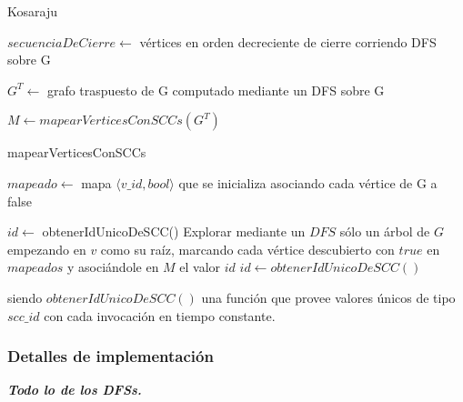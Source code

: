 \bigskip

\begin{algorithm}[H]
	\caption{Kosaraju}

    $\mathit{secuenciaDeCierre} \gets$ vértices en orden decreciente de cierre corriendo DFS sobre G \;

    $\mathit{G^T} \gets$ grafo traspuesto de G computado mediante un DFS sobre G \;

    $\mathit{M} \gets \mathit{mapearVerticesConSCCs(G^T)}$

\end{algorithm}

\bigskip

\begin{algorithm}[H]
    \caption{mapearVerticesConSCCs}

    $\mathit{mapeado} \gets$ mapa $\langle v\_id, bool \rangle$ que se inicializa asociando cada vértice de G a false\;

    $id \gets$ obtenerIdUnicoDeSCC()
     {
         {
            Explorar mediante un $DFS$ sólo un árbol de $G$ empezando en $v$ como su raíz, marcando cada vértice descubierto con $true$ en $mapeados$ y asociándole en $M$ el valor $id$ \;
            $id \gets obtenerIdUnicoDeSCC()$ \;
        }
    }

\end{algorithm}

\medskip

siendo $obtenerIdUnicoDeSCC()$ una función que provee valores únicos de tipo $scc\_id$ con cada invocación en tiempo constante.

\subsubsection{Detalles de implementación}

\textit{\textbf{Todo lo de los DFSs.}}
